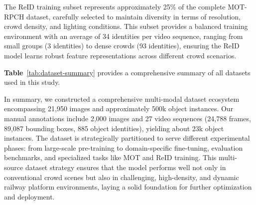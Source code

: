 The ReID training subset represents approximately 25\% of the complete MOT-RPCH dataset, carefully selected to maintain diversity in terms of resolution, crowd density, and lighting conditions. This subset provides a balanced training environment with an average of 34 identities per video sequence, ranging from small groups (3 identities) to dense crowds (93 identities), ensuring the ReID model learns robust feature representations across different crowd scenarios.


\textbf{Table}~\ref{tab:dataset-summary} provides a comprehensive summary of all datasets used in this study.

\begin{table}[H]
\centering
{}
\caption{Comprehensive Summary of All Datasets Used in This Study}
\label{tab:dataset-summary}
\end{table}
In summary, we constructed a comprehensive multi-modal dataset ecosystem encompassing 21,950 images and approximately 500k object instances. Our manual annotations include 2,000 images and 27 video sequences (24,788 frames, 89,087 bounding boxes, 885 object identities), yielding about 23k object instances. The dataset is strategically partitioned to serve different experimental phases: from large-scale pre-training to domain-specific fine-tuning, evaluation benchmarks, and specialized tasks like MOT and ReID training. This multi-source dataset strategy ensures that the model performs well not only in conventional crowd scenes but also in challenging, high-density, and dynamic railway platform environments, laying a solid foundation for further optimization and deployment.

